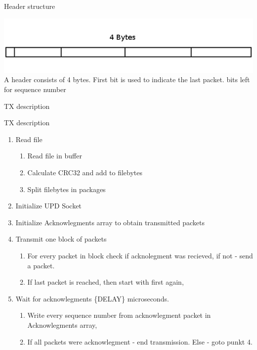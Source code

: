 \documentclass[10pt]{beamer}
\begin{document}
\begin{frame}[fragile]{Header structure}

  \includegraphics[width=\linewidth]{header}
  \newline
  A header consists of 4 bytes. 
  \newline
  First bit is used to indicate the last packet. 
   bits left for sequence number

\end{frame}


\begin{frame}[fragile]{TX description}
	\begin{block}{TX description}
		\begin{enumerate}
		\item Read file
		\begin{enumerate}
			\item Read file in buffer
			\item Calculate CRC32 and add to filebytes
			\item Split filebytes in packages
		\end{enumerate}
		\item Initialize UPD Socket
		\item Initialize Acknowlegments array to obtain transmitted packets
		\item Transmit one block of packets
		\begin{enumerate}
			\item For every packet in block check if acknolegment was recieved, if not - send a packet.
			\item If last packet is reached, then start with first again,
		\end{enumerate}
		\item Wait for acknowlegments \{DELAY\} microseconds.
		\begin{enumerate}
			\item Write every sequence number from acknowlegment packet in Acknowlegments array,
			\item If all packets were acknowlegment - end transmission. Else - goto punkt 4.
		\end{enumerate}
		\end{enumerate}
	\end{block}
\end{frame}
\end{document}
